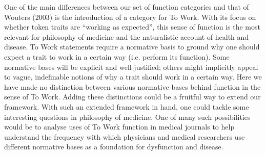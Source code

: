 \documentclass{article}
\begin{document}
One of the main differences between our set of function categories and that of Wouters (2003) is the introduction of a category for To Work.
With its focus on whether token traits are ``working as expected'', this sense of function is the most relevant for philosophy of medicine and the naturalistic account of health and disease.
To Work statements require a normative basis to ground why one should expect a trait to work in a certain way (i.e. perform its function).
Some normative bases will be explicit and well-justified; others might implicitly appeal to vague, indefinable notions of why a trait should work in a certain way.
Here we have made no distinction between various normative bases behind function in the sense of To Work.
Adding these distinctions could be a fruitful way to extend our framework.
With such an extended framework in hand, one could tackle some interesting questions in philosophy of medicine.
One of many such possibilities would be to analyse uses of To Work function in medical journals to help understand the frequency with which physicians and medical researchers use different normative bases as a foundation for dysfunction and disease.
\end{document}
